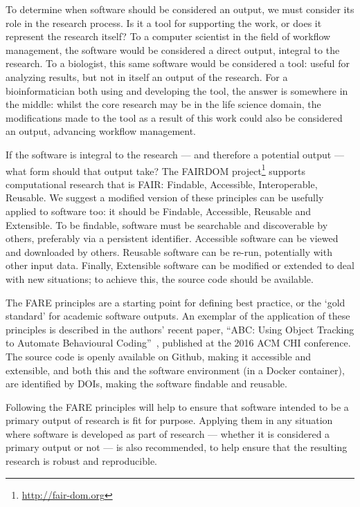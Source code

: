 \documentclass[a4paper,UKenglish]{dagrep}
\begin{document}
To determine when software should be considered an output, we must consider its role in the research process. Is it a tool for supporting the work, or does it represent the research itself? To a computer scientist in the field of workflow management, the software would be considered a direct output, integral to the research. To a biologist, this same software would be considered a tool: useful for analyzing results, but not in itself an output of the research. For a bioinformatician both using and developing the tool, the answer is somewhere in the middle: whilst the core research may be in the life science domain, the modifications made to the tool as a result of this work could also be considered an output, advancing workflow management.

If the software is integral to the research --- and therefore a potential output --- what form should that output take? The FAIRDOM project\footnote{\url{http://fair-dom.org}} supports computational research that is FAIR: Findable, Accessible, Interoperable, Reusable. We suggest a modified version of these principles can be usefully applied to software too: it should be Findable, Accessible, Reusable and Extensible. To be findable, software must be searchable and discoverable by others, preferably via a persistent identifier. Accessible software can be viewed and downloaded by others. Reusable software can be re-run, potentially with other input data. Finally, Extensible software can be modified or extended to deal with new situations; to achieve this, the source code should be available.

The FARE principles are a starting point for defining best practice, or the `gold standard' for academic software outputs. An exemplar of the application of these principles is described in the authors' recent paper, ``ABC: Using Object Tracking to Automate Behavioural Coding''~\cite{apaolaza_2016}, published at the 2016 ACM CHI conference. The source code is openly available on Github, making it accessible and extensible, and both this and the software environment (in a Docker container), are identified by DOIs, making the software findable and reusable.

Following the FARE principles will help to ensure that software intended to be a primary output of research is fit for purpose. Applying them in any situation where software is developed as part of research --- whether it is considered a primary output or not --- is also recommended, to help ensure that the resulting research is robust and reproducible.
\end{document}

